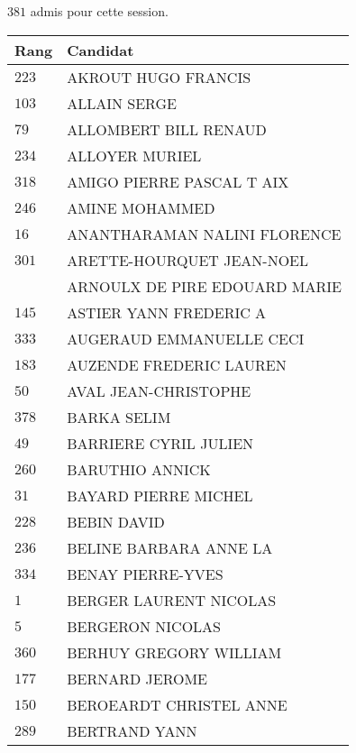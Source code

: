 



  $381$ admis pour cette session.

  \begin{xltabular}{\linewidth}{|l|X|}
    \hline
    \textbf{Rang} & \textbf{Candidat} \\
    \hline
    $223$ & AKROUT HUGO FRANCIS \\
    \hline
    $103$ & ALLAIN SERGE \\
    \hline
    $79$ & ALLOMBERT BILL RENAUD \\
    \hline
    $234$ & ALLOYER MURIEL \\
    \hline
    $318$ & AMIGO PIERRE PASCAL T AIX \\
    \hline
    $246$ & AMINE MOHAMMED \\
    \hline
    $16$ & ANANTHARAMAN NALINI FLORENCE \\
    \hline
    $301$ & ARETTE-HOURQUET JEAN-NOEL \\
    \hline
    & ARNOULX DE PIRE EDOUARD MARIE \\
    \hline
    $145$ & ASTIER YANN FREDERIC A \\
    \hline
    $333$ & AUGERAUD EMMANUELLE CECI \\
    \hline
    $183$ & AUZENDE FREDERIC LAUREN \\
    \hline
    $50$ & AVAL JEAN-CHRISTOPHE \\
    \hline
    $378$ & BARKA SELIM \\
    \hline
    $49$ & BARRIERE CYRIL JULIEN \\
    \hline
    $260$ & BARUTHIO ANNICK \\
    \hline
    $31$ & BAYARD PIERRE MICHEL \\
    \hline
    $228$ & BEBIN DAVID \\
    \hline
    $236$ & BELINE BARBARA ANNE LA \\
    \hline
    $334$ & BENAY PIERRE-YVES \\
    \hline
    $1$ & BERGER LAURENT NICOLAS \\
    \hline
    $5$ & BERGERON NICOLAS \\
    \hline
    $360$ & BERHUY GREGORY WILLIAM \\
    \hline
    $177$ & BERNARD JEROME \\
    \hline
    $150$ & BEROEARDT CHRISTEL ANNE \\
    \hline
    $289$ & BERTRAND YANN \\

\end{xltabular}
